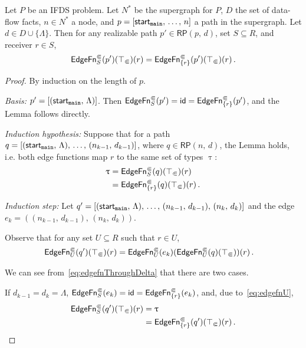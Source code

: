 \begin{lemma}\label{lem:recindepedgefn}
  Let $P$ be an IFDS problem. Let $N^*$ be the supergraph for $P$, $D$ the set of data-flow facts, $n\in N^*$ a node, and $p=[\textsf{start}_\texttt{main},\,\dots,\,n]$ a path in the supergraph. Let $d\in D\cup\{\Lambda\}$.
  Then for any realizable path $p'\in\textsf{RP}(p,\,d)$, set $S\subseteq R$, and receiver $r\in S$,
  \begin{equation}
    \textsf{EdgeFn}^\Subset_{S}(p')(\top_\Subset)(r)=
    \textsf{EdgeFn}^\Subset_{\{r\}}(p')(\top_\Subset)(r)\,.
  \end{equation}
\end{lemma}
\begin{proof}
  By induction on the length of $p$.
  
  \textit{Basis:} $p'=[(\textsf{start}_\texttt{main},\,\Lambda)]$. Then $\textsf{EdgeFn}^\Subset_{S}(p')=\textsf{id}=\textsf{EdgeFn}^\Subset_{\{r\}}(p')$, and the Lemma follows directly.
  
  \textit{Induction hypothesis:} Suppose that for a path $q=[(\textsf{start}_\texttt{main},\,\Lambda),\,\dots,\,(n_{k-1},\,d_{k-1})]$, where $q\in\textsf{RP}(n,\,d)$, the Lemma holds, i.e. both edge functions map $r$ to the same set of types $\uptau$:
  \begin{align*}
    \uptau
    &=\textsf{EdgeFn}^\Subset_{S}(q)(\top_\Subset)(r)\\
    &=\textsf{EdgeFn}^\Subset_{\{r\}}(q)(\top_\Subset)(r)\,.
  \end{align*}
  
  \textit{Induction step:} Let $q'=[(\textsf{start}_\texttt{main},\,\Lambda),\,\dots,\,(n_{k-1},\,d_{k-1}),\,(n_k,\,d_k)]$ and the edge $e_k=((n_{k-1},\,d_{k-1}),\,(n_k,\,d_k))$.
  
  Observe that for any set $U\subseteq R$ such that $r\in U$,
  \begin{align}\label{eq:edgefnU}
    \textsf{EdgeFn}^\Subset_{U}(q')(\top_\Subset)(r)
    &=\textsf{EdgeFn}^\Subset_{U}(e_k)(\textsf{EdgeFn}^\Subset_{U}(q)(\top_\Subset))(r)\,.
  \end{align}
  
  We can see from~\eqref{eq:edgefnThroughDelta} that there are two cases.  
  
  If $d_{k-1}=d_k=\Lambda$, $\textsf{EdgeFn}^\Subset_{S}(e_k)=\textsf{id}=\textsf{EdgeFn}^\Subset_{\{r\}}(e_k)$, and, due to~\eqref{eq:edgefnU},
  \begin{align*}
    \textsf{EdgeFn}^\Subset_{S}(q')(\top_\Subset)(r)&=\uptau\\
    &=\textsf{EdgeFn}^\Subset_{\{r\}}(q')(\top_\Subset)(r)\,.
  \end{align*}
  

\end{proof}
